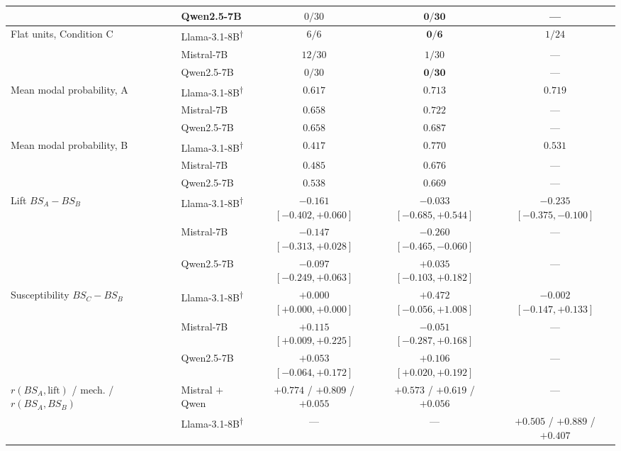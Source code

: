 \documentclass[11pt,journal,onecolumn]{IEEEtran}
\begin{document}
\begin{table}[!htbp]
\begin{tabular}{llccc}
 & Qwen2.5-7B & $0/30$ & $\mathbf{0/30}$ & --- \\
\midrule
\multirow{3}{*}{Flat units, Condition C} & Llama-3.1-8B\textsuperscript{$\dagger$} & $6/6$ & $\mathbf{0/6}$ & $1/24$ \\
 & Mistral-7B & $12/30$ & $1/30$ & --- \\
 & Qwen2.5-7B & $0/30$ & $\mathbf{0/30}$ & --- \\
\midrule
\multirow{3}{*}{Mean modal probability, A} & Llama-3.1-8B\textsuperscript{$\dagger$} & $0.617$ & $0.713$ & $0.719$ \\
 & Mistral-7B & $0.658$ & $0.722$ & --- \\
 & Qwen2.5-7B & $0.658$ & $0.687$ & --- \\
\multirow{3}{*}{Mean modal probability, B} & Llama-3.1-8B\textsuperscript{$\dagger$} & $0.417$ & $0.770$ & $0.531$ \\
 & Mistral-7B & $0.485$ & $0.676$ & --- \\
 & Qwen2.5-7B & $0.538$ & $0.669$ & --- \\
\midrule
\multirow{3}{*}{Lift $BS_A - BS_B$} & Llama-3.1-8B\textsuperscript{$\dagger$} & $-0.161$ $[-0.402, +0.060]$ & $-0.033$ $[-0.685, +0.544]$ & $\mathbf{-0.235}$ $[-0.375, -0.100]$ \\
 & Mistral-7B & $-0.147$ $[-0.313, +0.028]$ & $\mathbf{-0.260}$ $[-0.465, -0.060]$ & --- \\
 & Qwen2.5-7B & $-0.097$ $[-0.249, +0.063]$ & $+0.035$ $[-0.103, +0.182]$ & --- \\
\midrule
\multirow{3}{*}{Susceptibility $BS_C - BS_B$} & Llama-3.1-8B\textsuperscript{$\dagger$} & $+0.000$ $[+0.000, +0.000]$ & $+0.472$ $[-0.056, +1.008]$ & $-0.002$ $[-0.147, +0.133]$ \\
 & Mistral-7B & $\mathbf{+0.115}$ $[+0.009, +0.225]$ & $-0.051$ $[-0.287, +0.168]$ & --- \\
 & Qwen2.5-7B & $+0.053$ $[-0.064, +0.172]$ & $\mathbf{+0.106}$ $[+0.020, +0.192]$ & --- \\
\midrule
\multirow{2}{*}{$r(BS_A,\text{lift})$ / mech. / $r(BS_A, BS_B)$} & Mistral $+$ Qwen & $+0.774$ / $+0.809$ / $+0.055$ & $+0.573$ / $+0.619$ / $+0.056$ & --- \\
 & Llama-3.1-8B\textsuperscript{$\dagger$} & --- & --- & $+0.505$ / $+0.889$ / $+0.407$ \\
\bottomrule
\end{tabular}
\smallskip\\

\end{table}
\end{document}
